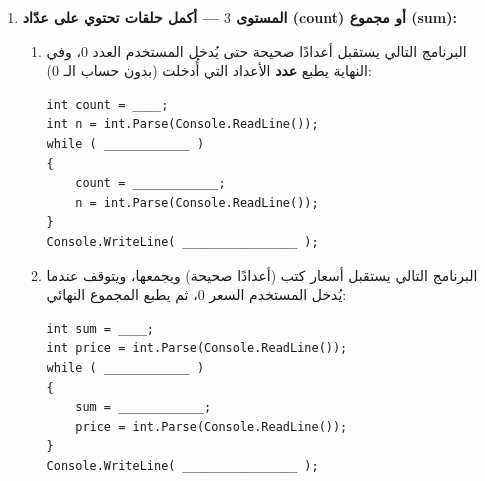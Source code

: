 \documentclass[14pt]{extarticle}
\begin{document}
\begin{enumerate}[itemsep=2em]
\begin{enumerate}
    \item البرنامج التالي يستقبل كلمة المرور (عدد صحيح)، وطالما كانت غير مطابقة لكلمة المرور الصحيحة $8264$ يطلب إدخالها من جديد، وفي النهاية يطبع \textenglish{"Welcome"}:
\begin{boxCode}
\begin{english}
\begin{verbatim}
int pass = int.Parse(Console.ReadLine());
while ( ____________ )
{
    Console.WriteLine("Wrong password, try again:");
    ____________________________________;
}
Console.WriteLine("Welcome");
\end{verbatim}
\end{english}
\end{boxCode}
\end{enumerate}
\ifwithsols
\begin{boxSolution}
\begin{english}
\begin{verbatim}
// a
int n = int.Parse(Console.ReadLine());
while (n % 7 != 0)
{
    n = int.Parse(Console.ReadLine());
}
Console.WriteLine(n);

// b
int pass = int.Parse(Console.ReadLine());
while (pass != 8264)
{
    Console.WriteLine("Wrong password, try again:");
    pass = int.Parse(Console.ReadLine());
}
Console.WriteLine("Welcome");
\end{verbatim}
\end{english}
\end{boxSolution}
\fi
\filbreak

\item \textbf{المستوى $3$ — أكمل حلقات تحتوي على عدّاد (\textenglish{count}) أو مجموع (\textenglish{sum}):}
\begin{enumerate}
    \item البرنامج التالي يستقبل أعدادًا صحيحة حتى يُدخل المستخدم العدد $0$، وفي النهاية يطبع \textbf{عدد} الأعداد التي أُدخلت (بدون حساب الـ $0$):
\begin{boxCode}
\begin{english}
\begin{verbatim}
int count = ____;
int n = int.Parse(Console.ReadLine());
while ( ____________ )
{
    count = ____________;
    n = int.Parse(Console.ReadLine());
}
Console.WriteLine( ________________ );
\end{verbatim}
\end{english}
\end{boxCode}

    \item البرنامج التالي يستقبل أسعار كتب (أعدادًا صحيحة) ويجمعها، ويتوقف عندما يُدخل المستخدم السعر $0$، ثم يطبع المجموع النهائي:
\begin{boxCode}
\begin{english}
\begin{verbatim}
int sum = ____;
int price = int.Parse(Console.ReadLine());
while ( ____________ )
{
    sum = ____________;
    price = int.Parse(Console.ReadLine());
}
Console.WriteLine( ________________ );
\end{verbatim}
\end{english}
\end{boxCode}


\end{enumerate}
\end{enumerate}
\end{document}
